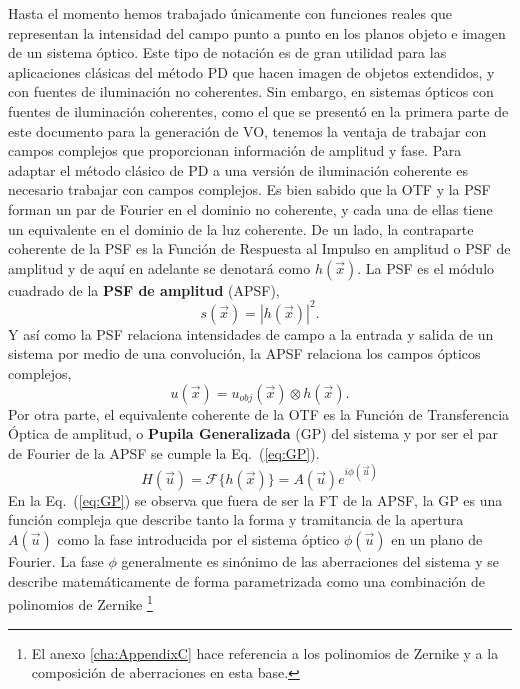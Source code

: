 Hasta el momento hemos trabajado únicamente con funciones reales que
representan la intensidad del campo punto a punto en los planos objeto
e imagen de un sistema óptico. Este tipo de notación es de gran utilidad para las
aplicaciones clásicas del método PD que hacen imagen de objetos
extendidos, y con fuentes de iluminación no coherentes. Sin embargo, en
sistemas ópticos con fuentes de iluminación coherentes, como el que se
presentó en la primera parte de este documento 
para la generación de VO, tenemos la ventaja de trabajar con
campos complejos que proporcionan información de amplitud y fase. Para
adaptar el método clásico de PD a una versión de iluminación coherente
es necesario trabajar con campos complejos. Es bien sabido que la OTF
y la PSF forman un par de Fourier en el dominio no coherente, y cada
una de ellas tiene un equivalente en el dominio de la luz
coherente. De un lado, la contraparte coherente de la PSF es la
Función de Respuesta al Impulso en amplitud o PSF de amplitud y de
aquí en adelante se denotará como $h(\vec{x})$. La PSF es el módulo
cuadrado de la \textbf{PSF de amplitud} (\acrshort{APSF}), 
\begin{equation}\label{eq:PSF}
s(\vec{x}) = |h(\vec{x})|^2.
\end{equation}
Y así como la PSF relaciona intensidades de campo a la entrada y salida de
un sistema por medio de una convolución, la APSF relaciona
los campos ópticos complejos,
 \begin{equation}\label{eq:Output_Image_complex}
u(\vec{x}) = u_{obj}(\vec{x}) \otimes h(\vec{x}).
\end{equation}
Por otra parte, el equivalente coherente de la OTF es la Función de
Transferencia Óptica de amplitud, o \textbf{Pupila Generalizada} (\acrshort{GP}) del sistema
y por ser el par de Fourier de la APSF se cumple la Eq.~(\ref{eq:GP}). 
\begin{equation}\label{eq:GP}
 H(\vec{u}) = \mathcal{F} \{h(\vec{x})\} =  A(\vec{u}) e^{i\phi(\vec{u})}
\end{equation}
En la Eq.~(\ref{eq:GP}) se observa que fuera de ser la FT de la APSF, la GP es
una función compleja que describe tanto la forma y
tramitancia de la apertura $A(\vec{u})$ como la fase introducida por
el sistema
óptico $\phi(\vec{u})$ en un plano de Fourier. La fase $\phi$ generalmente es sinónimo de las
aberraciones del sistema y se describe matemáticamente de forma
parametrizada como una combinación de polinomios de Zernike
\footnote{El anexo \ref{cha:AppendixC} hace referencia a los polinomios
  de Zernike y a la composición de aberraciones en esta base.}
